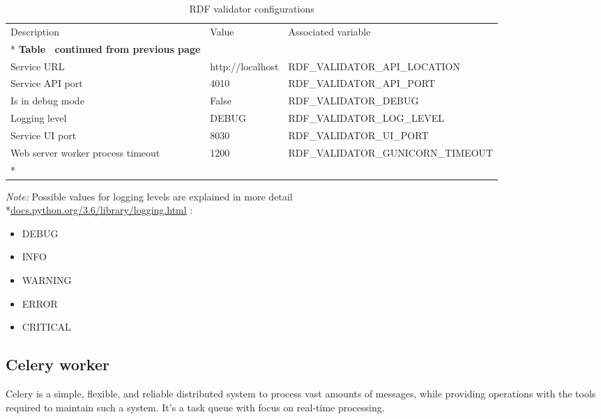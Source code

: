 \begin{longtable}[c]{@{}p{3.5cm}p{3.5cm}l@{}}
	\toprule
	Description                       & Value            & Associated variable               \\* \midrule
	\endfirsthead
	\multicolumn{3}{c}%
	{{\bfseries Table \thetable\ continued from previous page}}                              \\
	\endhead
	\bottomrule
	\endfoot
	\endlastfoot
	Service URL                       & http://localhost & RDF\_VALIDATOR\_API\_LOCATION     \\
	Service API port                  & 4010             & RDF\_VALIDATOR\_API\_PORT         \\
	Is in debug mode                  & False            & RDF\_VALIDATOR\_DEBUG             \\
	Logging level                     & DEBUG            & RDF\_VALIDATOR\_LOG\_LEVEL        \\
	Service UI port                   & 8030             & RDF\_VALIDATOR\_UI\_PORT          \\
	Web server worker process timeout & 1200             & RDF\_VALIDATOR\_GUNICORN\_TIMEOUT \\* \bottomrule
	\caption{RDF validator configurations}
	\label{tab:rdf-validator-configuration}                                                  \\
\end{longtable}

\textit{Note:} Possible values for logging levels are explained in more detail \\*\href{https://docs.python.org/3.6/library/logging.html#logging-levels}{docs.python.org/3.6/library/logging.html} :
\begin{itemize}
	\item DEBUG
	\item INFO
	\item WARNING
	\item ERROR
	\item CRITICAL
\end{itemize}

\subsection{Celery worker}
Celery is a simple, flexible, and reliable distributed system to process vast amounts of messages, while providing operations with the tools required to maintain such a system. It’s a task queue with focus on real-time processing.

